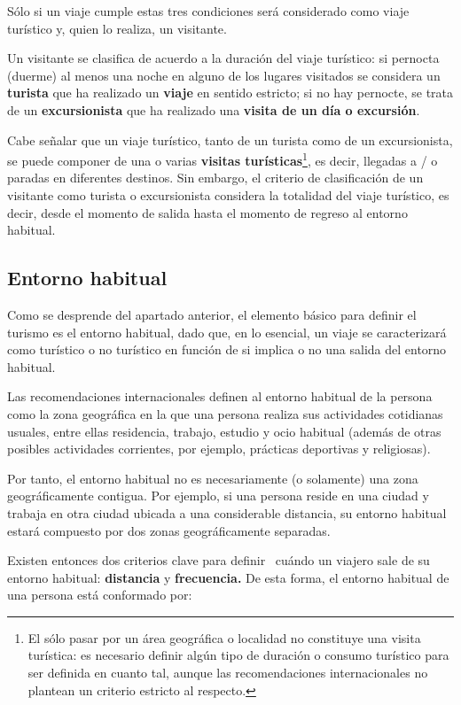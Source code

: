 \documentclass[
  openany]{book}
\begin{document}
Sólo si un viaje cumple estas tres condiciones será considerado como viaje turístico y, quien lo realiza, un visitante.

Un visitante se clasifica de acuerdo a la duración del viaje turístico: si pernocta (duerme) al menos una noche en alguno de los lugares visitados se considera un \textbf{turista} que ha realizado un \textbf{viaje} en sentido estricto; si no hay pernocte, se trata de un \textbf{excursionista} que ha realizado una \textbf{visita de un día o excursión}.

Cabe señalar que un viaje turístico, tanto de un turista como de un excursionista, se puede componer de una o varias \textbf{visitas turísticas}\footnote{El sólo pasar por un área geográfica o localidad no constituye una visita turística: es necesario definir algún tipo de duración o consumo turístico para ser definida en cuanto tal, aunque las recomendaciones internacionales no plantean un criterio estricto al respecto.}, es decir, llegadas a / o paradas en diferentes destinos. Sin embargo, el criterio de clasificación de un visitante como turista o excursionista considera la totalidad del viaje turístico, es decir, desde el momento de salida hasta el momento de regreso al entorno habitual.

\hypertarget{entorno-habitual}{%
\subsection{Entorno habitual}\label{entorno-habitual}}

Como se desprende del apartado anterior, el elemento básico para definir el turismo es el entorno habitual, dado que, en lo esencial, un viaje se caracterizará como turístico o no turístico en función de si implica o no una salida del entorno habitual.

Las recomendaciones internacionales definen al entorno habitual de la persona como la zona geográfica en la que una persona realiza sus actividades cotidianas usuales, entre ellas residencia, trabajo, estudio y ocio habitual (además de otras posibles actividades corrientes, por ejemplo, prácticas deportivas y religiosas).~

Por tanto, el entorno habitual no es necesariamente (o solamente) una zona geográficamente contigua. Por ejemplo, si una persona reside en una ciudad y trabaja en otra ciudad ubicada a una considerable distancia, su entorno habitual estará compuesto por dos zonas geográficamente separadas.~

Existen entonces dos criterios clave para definir~ cuándo un viajero sale de su entorno habitual: \textbf{distancia} y \textbf{frecuencia.} De esta forma, el entorno habitual de una persona está conformado por:
\end{document}

